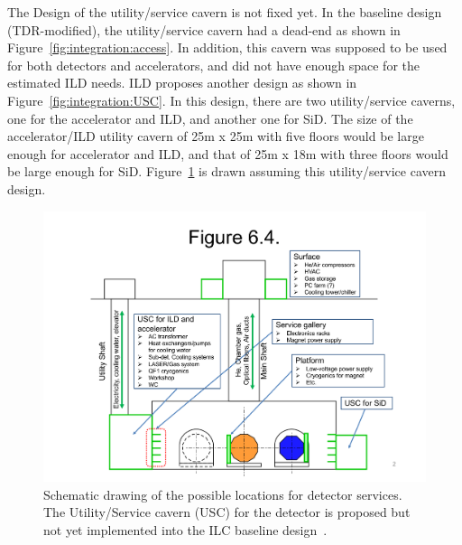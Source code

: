 The Design of the utility/service cavern is not fixed yet. In the baseline design (TDR-modified), the utility/service cavern had a dead-end as shown in Figure~\ref{fig:integration:access}. In addition, this cavern was supposed to be used for both detectors and accelerators, and did not have enough space for the estimated ILD needs. 
ILD proposes another design as shown in Figure~\ref{fig:integration:USC}. In this design, there are two utility/service caverns, one for the accelerator and ILD, and another one for SiD. The size of the accelerator/ILD utility cavern of 25m x 25m with five floors would be large enough for accelerator and ILD, and that of 25m x 18m with three floors would be large enough for SiD. Figure~\ref{fig:integration:services} is drawn assuming this utility/service cavern design.

\begin{figure}[h!]
\includegraphics[width=1.0\hsize]{Integration/fig/Services_v2.pdf}
\caption{\label{fig:integration:services}Schematic drawing of the possible locations for detector services. The Utility/Service cavern (USC) for the detector is proposed but not yet implemented into the ILC baseline design~\cite{ild:bib:services_figure}. }
\end{figure}

